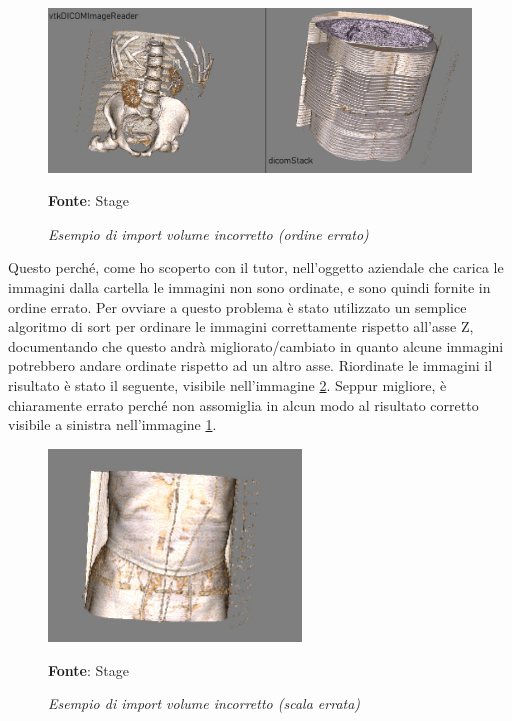\begin{figure}[h]
    \centering
    \includegraphics[width=1\textwidth]{immagini/svolgimento/volumebrokenorder.jpg}
    \caption{\textit{Esempio di import volume incorretto (ordine errato)}}
    \textbf{Fonte}: Stage
    \label{fig: Volume Wrong Order}
\end{figure}

Questo perché, come ho scoperto con il tutor, nell'oggetto aziendale che carica le immagini dalla cartella le immagini non sono ordinate, e sono quindi fornite in ordine errato. Per ovviare a questo problema è stato utilizzato un semplice algoritmo di sort per ordinare le immagini correttamente rispetto all'asse Z, documentando che questo andrà migliorato/cambiato in quanto alcune immagini potrebbero andare ordinate rispetto ad un altro asse. Riordinate le immagini il risultato è stato il seguente, visibile nell'immagine \ref{fig: Volume Wrong Scale}. Seppur migliore, è chiaramente errato perché non assomiglia in alcun modo al risultato corretto visibile a sinistra nell'immagine \ref{fig: Volume Wrong Order}.

\begin{figure}[h]
    \centering
    \includegraphics[width=0.6\textwidth]{immagini/svolgimento/volumebrokenscale.jpeg}
    \caption{\textit{Esempio di import volume incorretto (scala errata)}}
    \textbf{Fonte}: Stage
    \label{fig: Volume Wrong Scale}
\end{figure}

